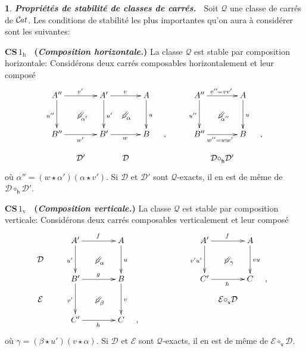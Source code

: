 \documentclass[francais]{smfart}
\theoremstyle{plain}
\theoremstyle{remark}
\theoremstyle{definition}
\newtheorem{paragr}[thm]{}
\numberwithin{equation}{thm}
\begin{document}
\begin{paragr} {\emph{\textbf{{Propriétés de stabilité de classes de carrés}.\ }}} \label{classstab}
Soit ${\mathcal{Q}}$ une classe de carrés de ${{\mathcal{C} \mspace{-2.mu} \it{at}}}$. Les conditions de stabilité les plus importantes qu'on aura à considérer sont les suivantes:
\smallskip

\noindent
\textbf{\boldmath CS\,$1_{\mathrm h}$ \ (\emph{Composition horizontale.})} La classe ${\mathcal{Q}}$ est stable par composition horizontale: 
Considérons deux carrés composables horizontalement et leur composé
\[
\xymatrixrowsep{1.1pc}
\xymatrixcolsep{.9pc}
\UseAllTwocells
\xymatrix{
A''\ddrrcompositemap<\omit>{\alpha'}
  \ar[rr]^{v'}
  \ar[dd]_{u''}
&&A'\ddrrcompositemap<\omit>{\alpha}
  \ar[rr]^{v}
  \ar[dd]^{u'}
&&A\ar[dd]^u
&&&A''\ddrrcompositemap<\omit>{\alpha''}
  \ar[rr]^{v''=vv'}
  \ar[dd]_{u''}
&&A\ar[dd]^u
\\
\\
B''\ar[rr]_{w'}
&&B'\ar[rr]_w
&&B
&,
&&B''\ar[rr]_{w''=ww'\,\,}
&&B
&,
\\
&\mathcal D'
&&\mathcal D
&&&&&\kern -10pt \mathcal D{\circ^{}_{\mathsf h}}\mathcal D'\kern -10pt
}
\]
où $\alpha'' =(w\star\alpha')(\alpha\star v')$. Si $\mathcal D$ et $\mathcal D'$ sont ${\mathcal{Q}}${\nobreakdash}-exacts, il en est de même de $\mathcal D{\circ^{}_{\mathsf h}}\mathcal D'$.
\smallbreak

\noindent
\textbf{\boldmath CS\,$1_{\mathrm v}$ \ (\emph{Composition verticale.})} La classe ${\mathcal{Q}}$ est stable par composition verticale: 
Considérons deux carrés composables verticalement et leur composé
$$
\xymatrixrowsep{.8pc}
\xymatrixcolsep{1.4pc}
\UseAllTwocells
\xymatrix{
&A'\ar[rr]^f\ar[dd]_{u'}\ddrrcompositemap<\omit>{\alpha}
&&A\ar[dd]^u
&&&&A'\ar[rr]^f\ar[dd]_{v'u'}\ddrrcompositemap<\omit>{\,\gamma}
&&A\ar[dd]^{vu}
\\
{\mathcal D}\quad
\\
&B'\ar[rr]^g\ar[dd]_{v'}\ddrrcompositemap<\omit>{\beta}
&&B\ar[dd]^v
&&&&C'\ar[rr]_h
&&C
&\hskip -15pt,
\\
{\mathcal E}\quad
&&&&&&&&\hskip -30pt{\mathcal E}{\circ^{}_{\mathsf v}}\mathcal D\hskip -30pt
\\
&C'\ar[rr]_h
&&C
&\hskip -15pt,
}
$$
où $\gamma =(\beta\star u')(v\star\alpha)$. Si $\mathcal D$ et $\mathcal E$ sont ${\mathcal{Q}}${\nobreakdash}-exacts, il en est de même de $\mathcal E{\circ^{}_{\mathsf v}}\mathcal D$.
\smallbreak


\end{paragr}
\end{document}
